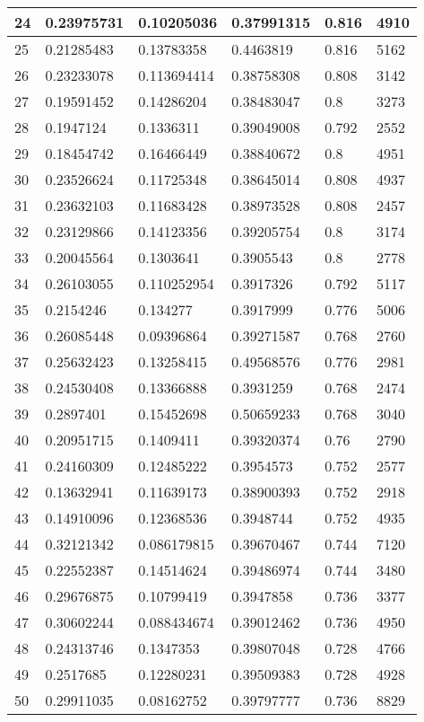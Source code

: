 \begin{longtable}{|l|l|l|l|l|l|}
24 & 0.23975731 & 0.10205036 & 0.37991315 & 0.816 & 4910 \\ \hline 
25 & 0.21285483 & 0.13783358 & 0.4463819 & 0.816 & 5162 \\ \hline 
26 & 0.23233078 & 0.113694414 & 0.38758308 & 0.808 & 3142 \\ \hline 
27 & 0.19591452 & 0.14286204 & 0.38483047 & 0.8 & 3273 \\ \hline 
28 & 0.1947124 & 0.1336311 & 0.39049008 & 0.792 & 2552 \\ \hline 
29 & 0.18454742 & 0.16466449 & 0.38840672 & 0.8 & 4951 \\ \hline 
30 & 0.23526624 & 0.11725348 & 0.38645014 & 0.808 & 4937 \\ \hline 
31 & 0.23632103 & 0.11683428 & 0.38973528 & 0.808 & 2457 \\ \hline 
32 & 0.23129866 & 0.14123356 & 0.39205754 & 0.8 & 3174 \\ \hline 
33 & 0.20045564 & 0.1303641 & 0.3905543 & 0.8 & 2778 \\ \hline 
34 & 0.26103055 & 0.110252954 & 0.3917326 & 0.792 & 5117 \\ \hline 
35 & 0.2154246 & 0.134277 & 0.3917999 & 0.776 & 5006 \\ \hline 
36 & 0.26085448 & 0.09396864 & 0.39271587 & 0.768 & 2760 \\ \hline 
37 & 0.25632423 & 0.13258415 & 0.49568576 & 0.776 & 2981 \\ \hline 
38 & 0.24530408 & 0.13366888 & 0.3931259 & 0.768 & 2474 \\ \hline 
39 & 0.2897401 & 0.15452698 & 0.50659233 & 0.768 & 3040 \\ \hline 
40 & 0.20951715 & 0.1409411 & 0.39320374 & 0.76 & 2790 \\ \hline 
41 & 0.24160309 & 0.12485222 & 0.3954573 & 0.752 & 2577 \\ \hline 
42 & 0.13632941 & 0.11639173 & 0.38900393 & 0.752 & 2918 \\ \hline 
43 & 0.14910096 & 0.12368536 & 0.3948744 & 0.752 & 4935 \\ \hline 
44 & 0.32121342 & 0.086179815 & 0.39670467 & 0.744 & 7120 \\ \hline 
45 & 0.22552387 & 0.14514624 & 0.39486974 & 0.744 & 3480 \\ \hline 
46 & 0.29676875 & 0.10799419 & 0.3947858 & 0.736 & 3377 \\ \hline 
47 & 0.30602244 & 0.088434674 & 0.39012462 & 0.736 & 4950 \\ \hline 
48 & 0.24313746 & 0.1347353 & 0.39807048 & 0.728 & 4766 \\ \hline 
49 & 0.2517685 & 0.12280231 & 0.39509383 & 0.728 & 4928 \\ \hline 
50 & 0.29911035 & 0.08162752 & 0.39797777 & 0.736 & 8829 \\ \hline 
\end{longtable}